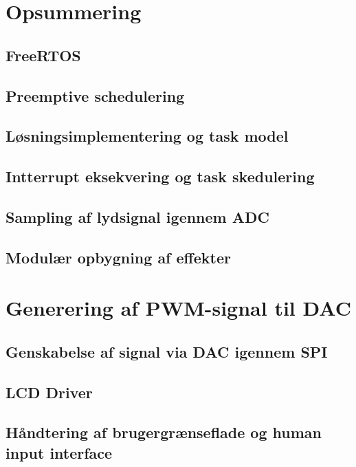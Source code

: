 \section{Opsummering}

\subsection{FreeRTOS}


\subsection{Preemptive schedulering}


\subsection{Løsningsimplementering og task model}


\subsection{Intterrupt eksekvering og task skedulering}


\subsection{Sampling af lydsignal igennem ADC}


\subsection{Modulær opbygning af effekter}


\section{Generering af PWM-signal til DAC}


\subsection{Genskabelse af signal via DAC igennem SPI}


\subsection{LCD Driver}


\subsection{Håndtering af brugergrænseflade og human input interface}